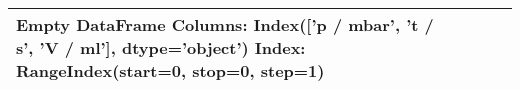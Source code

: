 \begin{tabular}{llll}
\toprule
Empty DataFrame
Columns: Index(['p / mbar', 't / s', 'V / ml'], dtype='object')
Index: RangeIndex(start=0, stop=0, step=1) \\
\bottomrule
\end{tabular}
